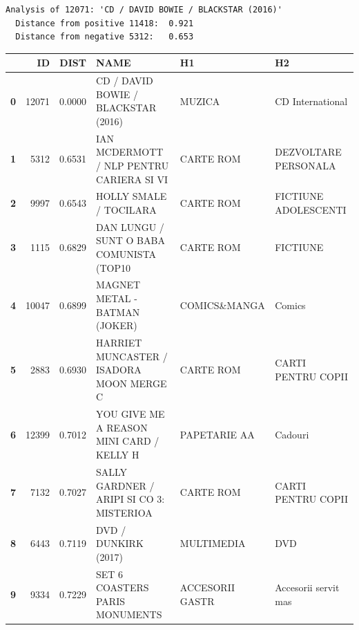 \documentclass[11pt]{article}
\begin{document}
\begin{Verbatim}[commandchars=\\\{\},fontsize=\footnotesize]
Analysis of 12071: 'CD / DAVID BOWIE / BLACKSTAR (2016)'
  Distance from positive 11418:  0.921
  Distance from negative 5312:   0.653

\end{Verbatim}



    \begin{center}
\scriptsize
\begin{tabular}{lrrlll}
\toprule
{} &     ID &    DIST &                                      NAME &               H1 &                    H2 \\
\midrule
\textbf{0} &  12071 &  0.0000 &       CD / DAVID BOWIE / BLACKSTAR (2016) &           MUZICA &      CD International \\
\textbf{1} &   5312 &  0.6531 &  IAN MCDERMOTT / NLP PENTRU CARIERA SI VI &        CARTE ROM &  DEZVOLTARE PERSONALA \\
\textbf{2} &   9997 &  0.6543 &                    HOLLY SMALE / TOCILARA &        CARTE ROM &  FICTIUNE ADOLESCENTI \\
\textbf{3} &   1115 &  0.6829 &  DAN LUNGU / SUNT O BABA COMUNISTA (TOP10 &        CARTE ROM &              FICTIUNE \\
\textbf{4} &  10047 &  0.6899 &             MAGNET METAL - BATMAN (JOKER) &     COMICS\&MANGA &                Comics \\
\textbf{5} &   2883 &  0.6930 &  HARRIET MUNCASTER / ISADORA MOON MERGE C &        CARTE ROM &    CARTI PENTRU COPII \\
\textbf{6} &  12399 &  0.7012 &  YOU GIVE ME A REASON MINI CARD / KELLY H &     PAPETARIE AA &               Cadouri \\
\textbf{7} &   7132 &  0.7027 &  SALLY GARDNER / ARIPI SI CO 3: MISTERIOA &        CARTE ROM &    CARTI PENTRU COPII \\
\textbf{8} &   6443 &  0.7119 &                      DVD / DUNKIRK (2017) &       MULTIMEDIA &                   DVD \\
\textbf{9} &   9334 &  0.7229 &            SET 6 COASTERS PARIS MONUMENTS &  ACCESORII GASTR &  Accesorii servit mas \\
\bottomrule
\end{tabular}
\end{center}


    
\end{document}
